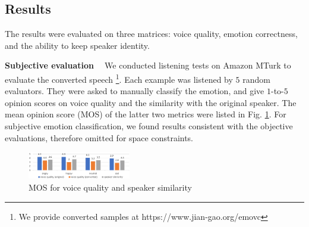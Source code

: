 \documentclass{article}
\begin{document}
\subsection{Results}
The results were evaluated on three matrices: voice quality, emotion correctness, and the ability to keep speaker identity.

\noindent \textbf{Subjective evaluation \ } We conducted listening tests on Amazon MTurk to evaluate the converted speech \footnote{We provide converted samples at https://www.jian-gao.org/emovc}. Each example was listened by $5$ random evaluators. They were asked to manually classify the emotion, and give $1$-to-$5$ opinion scores on voice quality and the similarity with the original speaker. The mean opinion score (MOS) of the latter two metrics were listed in Fig. \ref{fig:mos}. For subjective emotion classification, we found results consistent with the objective evaluations, therefore omitted for space constraints.



\begin{figure}[htb]
\center
\includegraphics[width=0.4\textwidth]{FIG/MOS}
\caption{MOS for voice quality and speaker similarity}
\label{fig:mos}
\end{figure}

\end{document}
